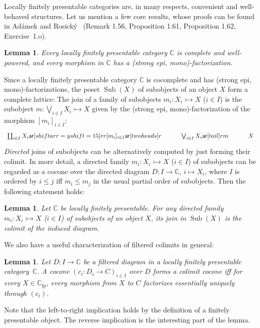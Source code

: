 \documentclass[10pt,a4paper]{article}
\newtheorem{lemma}[theorem]{Lemma}
\theoremstyle{definition}
\theoremstyle{remark}
\numberwithin{equation}{section}
\DeclareMathOperator{\Sub}{\mathrm{Sub}}
\newcommand{\lfplong}{locally finitely presentable\xspace}
\newcommand{\Lfplong}{Locally finitely presentable\xspace}
\newcommand{\lfp}{\lfplong}
\newcommand{\Lfp}{\Lfplong}
\newcommand{\ar}{\mathsf{ar}}
\providecommand{\C}{}
\newcommand{\fp}{{\mathrm{fp}}}
\renewcommand{\C}{{\mathbb{C}}}
\newcommand{\monoto}{\rightarrowtail}
\theoremstyle{plain}
\theoremstyle{definition}
\begin{document}
\Lfp categories are, in many respects, convenient and well-behaved structures. Let us mention a few core results, whose proofs can be found in Ad\'amek and Rosick\'y~\cite{adamek_rosicky_1994} (Remark 1.56, Proposition 1.61, Proposition 1.62, Exercise~1.o).

\begin{lemma}\label{lem:lfp-complete-wp}
Every \lfp category $\C$ is complete and well-powered, and every morphism in $\C$ has a (strong epi, mono)-factorization.
\end{lemma}
Since a \lfp category $\C$ is cocomplete and has (strong epi, mono)-factorizations, the poset $\Sub(X)$ of subobjects of an object $X$ form a complete lattice: The join of a family of subobjects $m_i\colon X_i\monoto X$ ($i\in I$) is the subobject $m\colon \bigvee_{i\in I} X_i \monoto X$ given by the (strong epi, mono)-factorization of the morphism $[m_i]_{i\in I}$:
\[ 
\begin{tikzcd}[outer sep=0pt]
\coprod_{i\in I} X_i
  \ar[shiftarr={yshift=15}]{rr}{[m_i]_{i\in I}}
  \ar[two heads]{r}
  & \bigvee_{i\in I} X_i \ar[tail]{r}{m}
  & X
   \end{tikzcd}
\]
\emph{Directed} joins of subobjects can be alternatively computed by just forming their colimit. In more detail, a directed family $m_i\colon X_i\monoto X$ ($i\in I$) of subobjects can be regarded as a cocone over the directed diagram $D\colon I\to \C$, $i\mapsto X_i$, where $I$ is ordered by $i\leq j$ iff $m_i\leq m_j$ in the usual partial order of subobjects. Then the following statement holds:


\begin{lemma}\label{lem:lfp-directed-unions}
Let $\C$ be \lfp. For any directed family $m_i\colon X_i\monoto X$ ($i\in I$) of subobjects of an object $X$, its join in $\Sub(X)$ is the colimit of the induced diagram.
\end{lemma}

We also have a useful characterization of filtered colimits in general:

\begin{lemma}\label{lem:filtered-colimits}
Let $D\colon I\to \C$ be a filtered diagram in a \lfp category~$\C$. A cocone $(c_i\colon D_i\to C)_{i\in I}$ over $D$ forms a colimit cocone iff for every $X\in \C_\fp$, every morphism from $X$ to $C$ factorizes essentially uniquely through $(c_i)$.
\end{lemma}
Note that the left-to-right implication holds by the definition of a finitely presentable object. The reverse implication is the interesting part of the lemma. 
\end{document}
